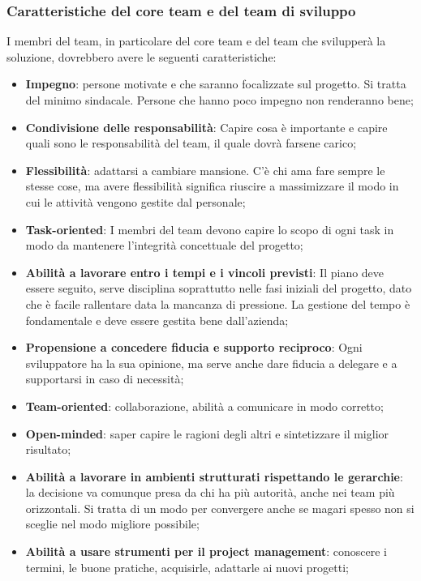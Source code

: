 \subsubsection{Caratteristiche del core team e del team di sviluppo}
I membri del team, in particolare del core team e del team che svilupperà la
soluzione, dovrebbero avere le seguenti caratteristiche:
\begin{itemize}
	\item \textbf{Impegno}: persone motivate e che saranno focalizzate sul progetto. Si tratta del minimo sindacale. Persone che hanno poco impegno non renderanno bene;
	\item \textbf{Condivisione delle responsabilità}: Capire cosa è importante e capire quali sono le responsabilità del team, il quale dovrà farsene carico;
	\item \textbf{Flessibilità}: adattarsi a cambiare mansione. C'è chi ama fare sempre le stesse cose, ma avere flessibilità significa riuscire a massimizzare il modo in cui le attività vengono gestite dal personale;
	\item \textbf{Task-oriented}: I membri del team devono capire lo scopo di ogni task in modo da mantenere l'integrità concettuale del progetto;
	\item \textbf{Abilità a lavorare entro i tempi e i vincoli previsti}: Il piano deve essere seguito, serve disciplina soprattutto nelle fasi iniziali del progetto, dato che è facile rallentare data la mancanza di pressione. La gestione del tempo è fondamentale e deve essere gestita bene dall'azienda;
	\item \textbf{Propensione a concedere fiducia e supporto reciproco}: Ogni sviluppatore ha la sua opinione, ma serve anche dare fiducia a delegare e a supportarsi in caso di necessità;
	\item \textbf{Team-oriented}: collaborazione, abilità a comunicare in modo corretto;
	\item \textbf{Open-minded}: saper capire le ragioni degli altri e sintetizzare il miglior risultato;
	\item \textbf{Abilità a lavorare in ambienti strutturati rispettando le gerarchie}: la decisione va comunque presa da chi ha più autorità, anche nei team più orizzontali. Si tratta di un modo per convergere anche se magari spesso non si sceglie nel modo migliore possibile;
	\item \textbf{Abilità a usare strumenti per il project management}: conoscere i termini, le buone pratiche, acquisirle, adattarle ai nuovi progetti;
\end{itemize}

